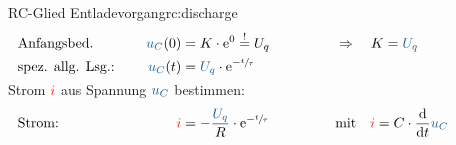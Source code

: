 {\begin{bsp}{RC-Glied Entladevorgang}{rc:discharge}
\begin{align*}
            &\text{Anfangsbed.}&&&
                \ecv{u_C}(0) &= K \cdot \mathrm{e}^{0} \overset{!}{=} U_q &&&&
                    \Rightarrow\quad K = \ecv{U_q}\\
            &\text{spez. allg. Lsg.:}&&&
                \ecv{u_C}(t) &= \ecv{U_q} \cdot  \mathrm{e}^{-\sfrac{t}{\tau}}
            \\[-15pt]&\hphantom{R1oooooooooooo}&&&\hphantom{L3ooo}&\hphantom{R3oooooooooooooooo}&&&&\hphantom{R5oooooooooooooooooooooo}\nonumber%
            \end{align*}
        Strom ${\color{red}i}$ aus Spannung $\ecv{u_C}$ bestimmen:%
        \begin{align*}%
            &\text{Strom:}&&&
                \eci{i} &= - \frac{\ecv{U_q}}{R} \cdot \mathrm{e}^{-\sfrac{t}{\tau}} &&&
                &\text{mit}\quad \eci{i} = C \cdot \frac{\mathrm{d}}{\mathrm{d}t} \ecv{u_C}
            \\[-15pt]&\hphantom{R1oooooooooooo}&&&\hphantom{L3ooo}&\hphantom{R3oooooooooooooooo}&&&&\hphantom{R5oooooooooooooooooooooo}\nonumber%
        \end{align*}
        \endgroup
    \end{bsp}
}%



